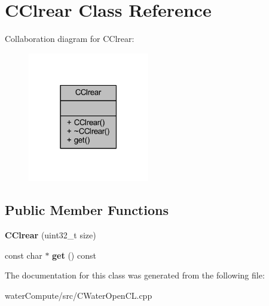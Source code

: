 \hypertarget{class_c_clrear}{}\section{C\+Clrear Class Reference}
\label{class_c_clrear}


Collaboration diagram for C\+Clrear\+:
\nopagebreak
\begin{figure}[H]
\begin{center}
\leavevmode
\includegraphics[width=150pt]{class_c_clrear__coll__graph}
\end{center}
\end{figure}
\subsection*{Public Member Functions}
\begin{DoxyCompactItemize}
\item 
\mbox{\label{class_c_clrear_a66fef7166032cecdf34bfbff9caf68d4}} 
{\bfseries C\+Clrear} (uint32\+\_\+t size)
\item 
\mbox{\label{class_c_clrear_ad27f3959940d997828caa2b7db457947}} 
const char $\ast$ {\bfseries get} () const
\end{DoxyCompactItemize}


The documentation for this class was generated from the following file\+:\begin{DoxyCompactItemize}
\item 
water\+Compute/src/C\+Water\+Open\+C\+L.\+cpp\end{DoxyCompactItemize}
